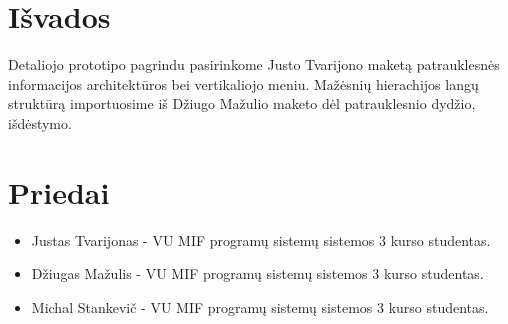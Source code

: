 \documentclass[oneside]{VUMIFPSkursinis}
\begin{document}
\section{Išvados}
Detaliojo prototipo pagrindu pasirinkome Justo Tvarijono maketą patrauklesnės informacijos architektūros bei vertikaliojo meniu. Mažėsnių hierachijos langų struktūrą importuosime iš Džiugo Mažulio maketo dėl patrauklesnio dydžio, išdėstymo. 
\section{Priedai}
	\begin{itemize}
		\item Justas Tvarijonas - VU MIF programų sistemų sistemos 3 kurso studentas.
		\item Džiugas Mažulis - VU MIF programų sistemų sistemos 3 kurso studentas.
		\item Michal Stankevič - VU MIF programų sistemų sistemos 3 kurso studentas.
	\end{itemize}
\end{document}

